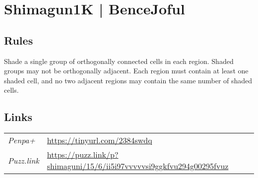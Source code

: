 \section[Shimagun1K | BenceJoful {[\emph{Shimaguni/Islands}]}]{Shimagun1K | {\normalfont BenceJoful}}
\label{sec:49-shimagun1k-bencejoful}

\subsection*{Rules}
\begin{markdown}
Shade a single group of orthogonally connected cells in each region. Shaded groups may not be orthogonally adjacent. Each region must contain at least one shaded cell, and no two adjacent regions may contain the same number of shaded cells.
\end{markdown}
\subsection*{Links}
\begin{tabularx}{\textwidth}{l X}
\emph{Penpa+} & \url{https://tinyurl.com/2384swdq } \\
\emph{Puzz.link} & \url{https://puzz.link/p?shimaguni/15/6/ii5i97vvvvvsi9ggkfvu294g00295fvuz} \\
\end{tabularx}
\pagebreak
